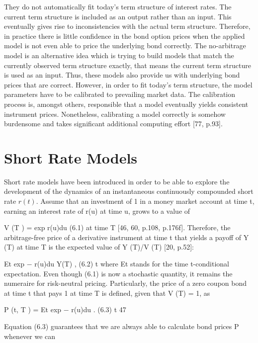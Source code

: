 They do not automatically fit today’s term structure of interest rates. 
The current term structure is included as an output rather than an input. 
This eventually gives rise to inconsistencies with the actual term structure. 
Therefore, in practice there is little confidence in the bond option 
prices when the applied model is not even able to price the underlying 
bond correctly.
The no-arbitrage model is an alternative idea which is trying to build models that match the currently observed term structure exactly, that means the current term structure is used as an input. Thus, these models also provide us with underlying bond prices that are correct. However, in order to fit today’s term structure, the model parameters have to be calibrated to prevailing market data. The calibration process is, amongst others, responsible that a model eventually yields consistent instrument prices. Nonetheless, calibrating a model correctly is somehow burdensome and takes significant additional computing effort [77, p.93].

\section{Short Rate Models}
Short rate models have been introduced in order to be able to explore the development of the dynamics of an instantaneous continuously compounded short rate $r(t)$. 
Assume that an investment of 1 in a money market account at time t, earning an interest rate of r(u) at time u, grows to a value of

V (T ) = exp r(u)du (6.1)
at time T [46, 60, p.108, p.176f]. Therefore, the arbitrage-free price of a derivative instrument at time t that yields a payoff of Y (T) at time T is the expected value of Y (T)/V (T) [20, p.52]:

Et exp − r(u)du Y(T) , (6.2)
t
where Et stands for the time t-conditional expectation. Even though (6.1) is now a stochastic
quantity, it remains the numeraire for risk-neutral pricing. Particularly, the price of a zero
coupon bond at time t that pays 1 at time T is defined, given that V (T) = 1, as 

P (t, T ) = Et exp − r(u)du . (6.3) t
47

Equation (6.3) guarantees that we are always able to calculate bond prices P whenever we can

